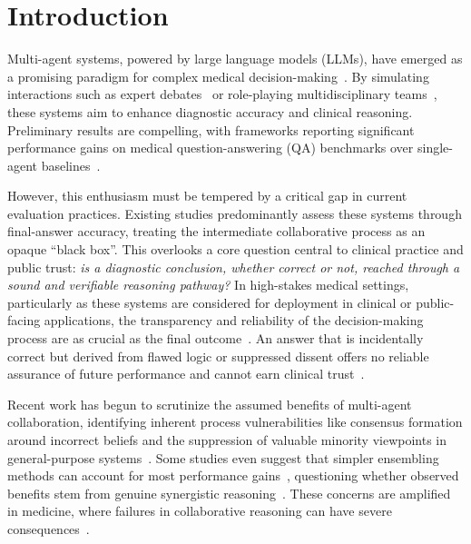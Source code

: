 \section{Introduction}
Multi-agent systems, powered by large language models (LLMs), have emerged as a promising paradigm for complex medical decision-making~\cite{li2023camel, arora2023promise,zhu2025healthflow}. By simulating interactions such as expert debates~\cite{du2023improving} or role-playing multidisciplinary teams~\cite{tang2024medagents,kim2024mdagents}, these systems aim to enhance diagnostic accuracy and clinical reasoning. Preliminary results are compelling, with frameworks reporting significant performance gains on medical question-answering (QA) benchmarks over single-agent baselines~\cite{chen2024reconcile,wu2024autogen,moor2023foundation}.

However, this enthusiasm must be tempered by a critical gap in current evaluation practices. Existing studies predominantly assess these systems through final-answer accuracy, treating the intermediate collaborative process as an opaque ``black box''. This overlooks a core question central to clinical practice and public trust: \emph{is a diagnostic conclusion, whether correct or not, reached through a sound and verifiable reasoning pathway?} In high-stakes medical settings, particularly as these systems are considered for deployment in clinical or public-facing applications, the transparency and reliability of the decision-making process are as crucial as the final outcome~\cite{ribeiro2016should}. An answer that is incidentally correct but derived from flawed logic or suppressed dissent offers no reliable assurance of future performance and cannot earn clinical trust~\cite{sbaffi2017trust}.

Recent work has begun to scrutinize the assumed benefits of multi-agent collaboration, identifying inherent process vulnerabilities like consensus formation around incorrect beliefs and the suppression of valuable minority viewpoints in general-purpose systems~\cite{pan2025multiagent,choi2025debate,zhu2025medagentboard}. Some studies even suggest that simpler ensembling methods can account for most performance gains~\cite{choi2025debate,kaesberg2025voting}, questioning whether observed benefits stem from genuine synergistic reasoning~\cite{madaan2023selfrefine}. These concerns are amplified in medicine, where failures in collaborative reasoning can have severe consequences~\cite{huang2023large}.

